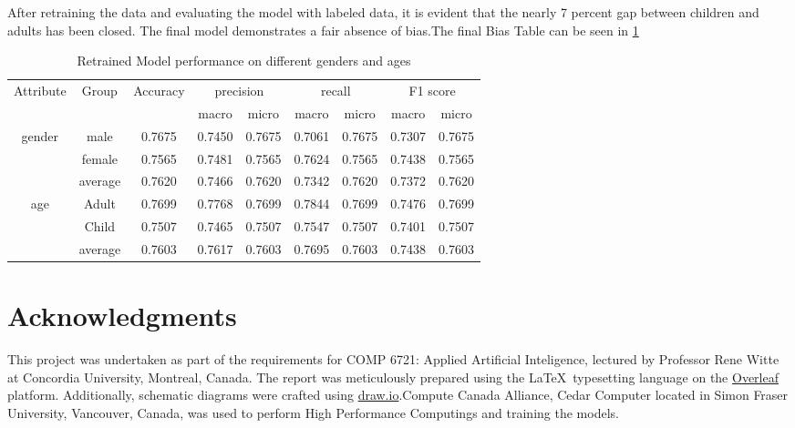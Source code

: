 \documentclass[]{report}
\begin{document}
After retraining the data and evaluating the model with labeled data, it is evident that the nearly 7 percent gap between children and adults has been closed. The final model demonstrates a fair absence of bias.The final Bias Table can be seen in \ref{tab:rebias}
 \begin{table}[h]
 	\centering
 	\caption{Retrained Model performance on different genders and ages}
 	\begin{tabular}{|c|c|c|cc|cc|cc|}
 		\hline
 		\multirow{2}{*}{Attribute} &
 		\multirow{2}{*}{Group} &
 		\multirow{2}{*}{Accuracy} &
 		\multicolumn{2}{c|}{precision} &
 		\multicolumn{2}{c|}{recall} &
 		\multicolumn{2}{c|}{F1 score} \\ \cline{4-9} 
 		&         &        & \multicolumn{1}{c|}{macro}  & micro  & \multicolumn{1}{c|}{macro}  & micro  & \multicolumn{1}{c|}{macro}  & micro  \\ \hline
 		\multirow{3}{*}{gender} & male    & 0.7675 & \multicolumn{1}{c|}{0.7450} & 0.7675 & \multicolumn{1}{c|}{0.7061} & 0.7675 & \multicolumn{1}{c|}{0.7307} & 0.7675 \\ \cline{2-9} 
 		& female  & 0.7565 & \multicolumn{1}{c|}{0.7481} & 0.7565 & \multicolumn{1}{c|}{0.7624} & 0.7565 & \multicolumn{1}{c|}{0.7438} & 0.7565 \\ \cline{2-9} 
 		& average & 0.7620 & \multicolumn{1}{c|}{0.7466} & 0.7620 & \multicolumn{1}{c|}{0.7342} & 0.7620 & \multicolumn{1}{c|}{0.7372} & 0.7620 \\ \hline
 		\multirow{3}{*}{age}    & Adult   & 0.7699 & \multicolumn{1}{c|}{0.7768} & 0.7699 & \multicolumn{1}{c|}{0.7844} & 0.7699 & \multicolumn{1}{c|}{0.7476} & 0.7699 \\ \cline{2-9} 
 		& Child   & 0.7507 & \multicolumn{1}{c|}{0.7465} & 0.7507 & \multicolumn{1}{c|}{0.7547} & 0.7507 & \multicolumn{1}{c|}{0.7401} & 0.7507 \\ \cline{2-9} 
 		& average & 0.7603 & \multicolumn{1}{c|}{0.7617} & 0.7603 & \multicolumn{1}{c|}{0.7695} & 0.7603 & \multicolumn{1}{c|}{0.7438} & 0.7603 \\ \hline
 	\end{tabular}
 	\label{tab:rebias}
 \end{table}
\chapter*{Acknowledgments}

This project was undertaken as part of the requirements for COMP 6721: Applied Artificial Inteligence, lectured by Professor Rene Witte at Concordia University, Montreal, Canada. The report was meticulously prepared using the \LaTeX\ typesetting language on the \href{https://www.overleaf.com/}{Overleaf} platform. Additionally, schematic diagrams were crafted using \href{https://app.diagrams.net/}{draw.io}.Compute Canada Alliance, Cedar Computer located in Simon Fraser University, Vancouver, Canada, was used to perform High Performance Computings and training the models.



 
\end{document}
